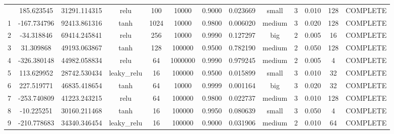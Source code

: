 \begin{longtable}{ccccccccccccc}
\bottomrule
\endlastfoot
                        0 &                 185.623545 &                       31291.114315 &            relu &         100 &        10000 & 0.9000 &       0.023669 &     small &             3 & 0.010 &         128 & COMPLETE \\
                        1 &                -167.734796 &                       92413.861316 &            tanh &        1024 &        10000 & 0.9800 &       0.006020 &    medium &             3 & 0.020 &         128 & COMPLETE \\
                        2 &                 -34.318846 &                       69414.245841 &            relu &         256 &        10000 & 0.9990 &       0.127297 &       big &             2 & 0.005 &          16 & COMPLETE \\
                        3 &                  31.309868 &                       49193.063867 &            tanh &         128 &       100000 & 0.9500 &       0.782190 &    medium &             2 & 0.050 &         128 & COMPLETE \\
                        4 &                -326.380148 &                       44982.058834 &            relu &          64 &      1000000 & 0.9990 &       0.979245 &    medium &             2 & 0.005 &           4 & COMPLETE \\
                        5 &                 113.629952 &                       28742.530434 &     leaky\_relu &          16 &       100000 & 0.9500 &       0.015899 &     small &             3 & 0.010 &          32 & COMPLETE \\
                        6 &                 227.519771 &                       46835.418654 &            tanh &          64 &        10000 & 0.9999 &       0.001164 &       big &             3 & 0.020 &          32 & COMPLETE \\
                        7 &                -253.740809 &                       41223.243215 &            relu &          64 &       100000 & 0.9800 &       0.022737 &    medium &             3 & 0.010 &         128 & COMPLETE \\
                        8 &                 -10.225251 &                       30160.211468 &            tanh &          16 &       100000 & 0.9950 &       0.080639 &     small &             3 & 0.050 &           4 & COMPLETE \\
                        9 &                -210.778683 &                       34340.346454 &     leaky\_relu &          16 &       100000 & 0.9000 &       0.031906 &    medium &             2 & 0.010 &          64 & COMPLETE \\

\end{longtable}
